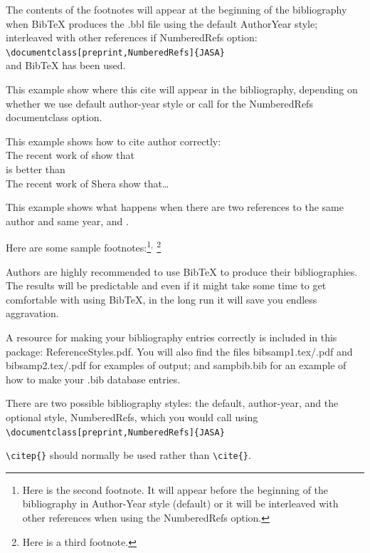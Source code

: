 \documentclass[preprint]{JASA}
\begin{document}
The contents of the footnotes will appear at the beginning of the
bibliography when BibTeX produces the .bbl file using the default
AuthorYear style; interleaved with other references if 
Numbered\-Refs option:\\
\verb+\documentclass[preprint,NumberedRefs]{JASA}+\\
and BibTeX has been used.

This example show where this cite \citep{booksamp1} will appear in the
bibliography,
depending on whether we use default author-year style
or call for the NumberedRefs documentclass option.

This example shows how to cite author correctly:\\
The recent work of \citet{Shera2} show that\\
is better than\\
The recent work of Shera \cite{Shera2} show that\ldots

This example shows what happens when there are two references to the
same author and same year, \citet{Shera2} and \citet{Shera}.

Here are some sample footnotes:\footnote{Here is the second footnote.
It will appear before the beginning of the bibliography in Author-Year
style (default) or it will be 
 interleaved with other references when using the Numbered\-Refs
 option.}$^,$%
\footnote{Here is a third footnote.}


Authors are highly  recommended to use BibTeX to produce their
bibliographies. The results will be predictable and even if
it might take some time to get comfortable with  using BibTeX,
in the long run it will save you endless aggravation.

A resource for making your bibliography entries
correctly is included in this package: 
ReferenceStyles.pdf. You will also find
the files
bibsamp1.tex/.pdf and bibsamp2.tex/.pdf
for examples of output; and sampbib.bib for an example of
how to make your .bib database entries.

There are two possible bibliography styles: the default, author-year,
and the optional style, Numbered\-Refs, which you would call using\\
{\verb+\documentclass[preprint,NumberedRefs]{JASA}+ }

\verb+\citep{}+ should normally be used rather than \verb+\cite{}+.
\end{document}
